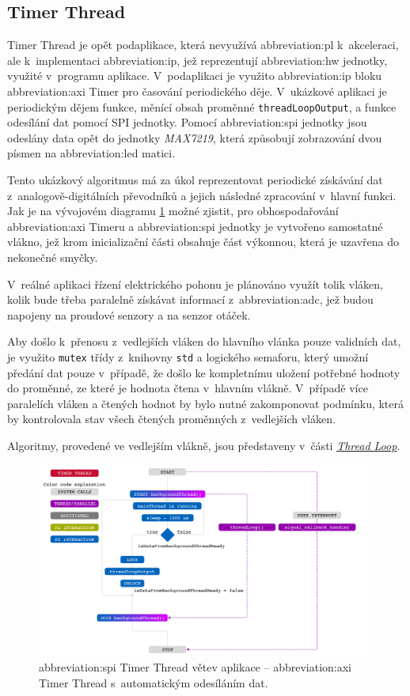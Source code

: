 \documentclass[a4paper, twoside, 11pt]{article}
\begin{document}
	\subsection{Timer Thread}
	Timer Thread je opět podaplikace, která nevyužívá \gls{abbreviation:pl} k~akceleraci, ale k~implementaci \gls{abbreviation:ip}, jež reprezentují \gls{abbreviation:hw} jednotky, využité v~programu aplikace. V~podaplikaci je využito \gls{abbreviation:ip} bloku \gls{abbreviation:axi} Timer pro časování periodického děje. V~ukázkové aplikaci je periodickým dějem funkce, měnící obsah proměnné \texttt{threadLoopOutput}, a funkce odesílání dat pomocí SPI jednotky. Pomocí \gls{abbreviation:spi} jednotky jsou odeslány data opět do jednotky \textit{MAX7219}, která způsobují zobrazování dvou písmen na \gls{abbreviation:led} matici.\par
	Tento ukázkový algoritmus má za úkol reprezentovat periodické získávání dat z~analogově-digitálních převodníků a jejich následné zpracování v~hlavní funkci. Jak je na vývojovém diagramu \ref{fig:timer-thread} možné zjistit, pro obhospodařování \gls{abbreviation:axi} Timeru a \gls{abbreviation:spi} jednotky je vytvořeno samostatné vlákno, jež krom inicializační části obsahuje část výkonnou, která je uzavřena do nekonečné smyčky.\par
	V~reálné aplikaci řízení elektrického pohonu je plánováno využít tolik vláken, kolik bude třeba paralelně získávat informací z~\gls{abbreviation:adc}, jež budou napojeny na proudové senzory a na senzor otáček.\par
	Aby došlo k~přenosu z~vedlejších vláken do hlavního vlánka pouze validních dat, je využito \texttt{mutex} třídy z~knihovny \texttt{std} a logického semaforu, který umožní předání dat pouze v~případě, že došlo ke kompletnímu uložení potřebné hodnoty do proměnné, ze které je hodnota čtena v~hlavním vlákně. V~případě více paralelích vláken a čtených hodnot by bylo nutné zakomponovat podmínku, která by kontrolovala stav všech čtených proměnných z~vedlejších vláken.\par
	Algoritmy, provedené ve vedlejším vlákně, jsou představeny v~části \hyperref[subsubsec:thread-loop]{\textit{Thread Loop}}.
	\begin{figure}[htbp!]
	 	\centering
	 	\includegraphics[width=1\textwidth]{src/pdf/timer-thread.pdf}
		\caption{\gls{abbreviation:spi} Timer Thread větev aplikace – \gls{abbreviation:axi} Timer Thread s~automatickým odesíláním dat.}
	 \label{fig:timer-thread}
 \end{figure}
\end{document}
